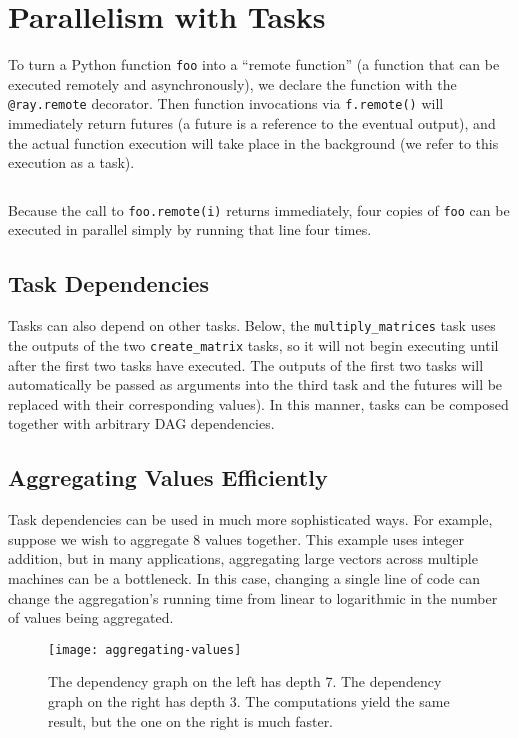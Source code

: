 \section{Parallelism with Tasks}
To turn a Python function \verb|foo| into a “remote function” (a function that can be executed remotely and asynchronously), we declare the function with the \verb|@ray.remote| decorator. Then function invocations via \verb|f.remote()| will immediately return futures (a future is a reference to the eventual output), and the actual function execution will take place in the background (we refer to this execution as a task).

\inputminted{python}{../src/01.TaskParallelism.py}

Because the call to \verb|foo.remote(i)| returns immediately, four copies of \verb|foo| can be executed in parallel simply by running that line four times.

\subsection{Task Dependencies}
Tasks can also depend on other tasks. Below, the \verb|multiply_matrices| task uses the outputs of the two \verb|create_matrix| tasks, so it will not begin executing until after the first two tasks have executed. The outputs of the first two tasks will automatically be passed as arguments into the third task and the futures will be replaced with their corresponding values). In this manner, tasks can be composed together with arbitrary DAG dependencies.

\subsection{Aggregating Values Efficiently}
Task dependencies can be used in much more sophisticated ways. For example, suppose we wish to aggregate 8 values together. This example uses integer addition, but in many applications, aggregating large vectors across multiple machines can be a bottleneck. In this case, changing a single line of code can change the aggregation’s running time from linear to logarithmic in the number of values being aggregated.

\begin{figure}[!htbp]
    \centering
    \texttt{[image: aggregating-values]}
    \caption{The dependency graph on the left has depth 7. The dependency graph on the right has depth 3. The computations yield the same result, but the one on the right is much faster.}
\end{figure}

